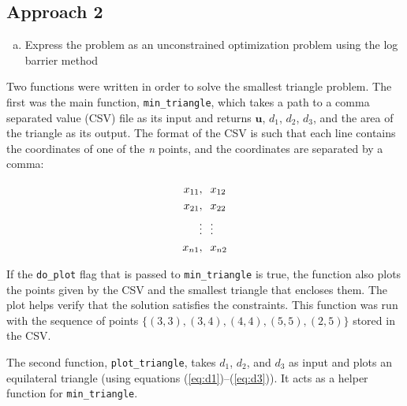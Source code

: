 \documentclass{article}
\begin{document}
\subsection{Approach 2}

\begin{enumerate}[a)]
	\item Express the problem as an unconstrained optimization problem using the log barrier method
	
	
\end{enumerate}


Two functions were written in order to solve the smallest triangle problem.
The first was the main function, \texttt{min\_triangle}, which takes a path to a comma separated value (CSV) file as its input and returns $\mathbf{u}$, $d_1$, $d_2$, $d_3$, and the area of the triangle as its output.
The format of the CSV is such that each line contains the coordinates of one of the \textit{n} points, and the coordinates are separated by a comma:

\begin{align*}
x_{11}, & \hspace{0.1in} x_{12}\\
x_{21}, & \hspace{0.1in} x_{22}\\
\vdots & \hspace{0.1in} \vdots\\
x_{n1}, & \hspace{0.1in} x_{n2}
\end{align*}

\noindent If the \texttt{do\_plot} flag that is passed to \texttt{min\_triangle} is true, the function also plots the points given by the CSV and the smallest triangle that encloses them.
The plot helps verify that the solution satisfies the constraints.
This function was run with the sequence of points $\{(3,3), (3,4), (4,4), (5,5), (2,5)\}$ stored in the CSV.

The second function, \texttt{plot\_triangle}, takes $d_1$, $d_2$, and $d_3$ as input and plots an equilateral triangle (using equations (\ref{eq:d1})--(\ref{eq:d3})).
It acts as a helper function for \texttt{min\_triangle}.
\end{document}
